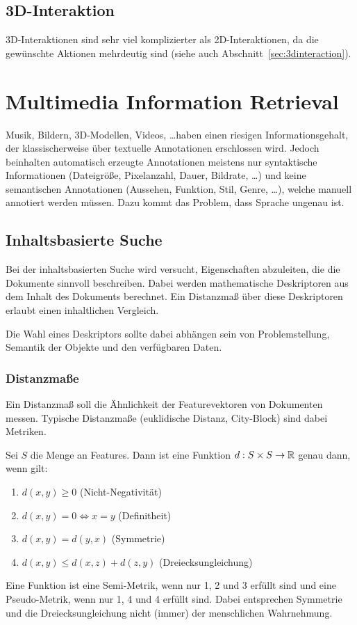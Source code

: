 	\section{3D-Interaktion}
		3D-Interaktionen sind sehr viel komplizierter als 2D-Interaktionen, da die gewünschte Aktionen mehrdeutig sind (siehe auch Abschnitt~\ref{sec:3dinteraction}).

\chapter{Multimedia Information Retrieval}
	Musik, Bildern, 3D-Modellen, Videos, \dots haben einen riesigen Informationsgehalt, der klassischerweise über textuelle Annotationen erschlossen wird. Jedoch beinhalten automatisch erzeugte Annotationen meistens nur syntaktische Informationen (Dateigröße, Pixelanzahl, Dauer, Bildrate, \dots) und keine semantischen Annotationen (Aussehen, Funktion, Stil, Genre, \dots), welche manuell annotiert werden müssen. Dazu kommt das Problem, dass Sprache \iA ungenau ist.

	\section{Inhaltsbasierte Suche}
		Bei der inhaltsbasierten Suche wird versucht, Eigenschaften abzuleiten, die die Dokumente sinnvoll beschreiben. Dabei werden mathematische Deskriptoren aus dem Inhalt des Dokuments berechnet. Ein Distanzmaß über diese Deskriptoren erlaubt einen inhaltlichen Vergleich.
		
		Die Wahl eines Deskriptors sollte dabei abhängen sein von Problemstellung, Semantik der Objekte und den verfügbaren Daten.

		\subsection{Distanzmaße}
			Ein Distanzmaß soll die Ähnlichkeit der Featurevektoren von Dokumenten messen. Typische Distanzmaße (euklidische Distanz, City-Block) sind dabei Metriken.
			
			Sei \(S\) die Menge an Features. Dann ist eine Funktion \( d : S \times S \to \mathbb{R} \) genau dann, wenn gilt:
			\begin{enumerate}
				\item \( d(x, y) \geq 0 \) (Nicht-Negativität)
				\item \( d(x, y) = 0 \iff x = y \) (Definitheit)
				\item \( d(x, y) = d(y, x) \) (Symmetrie)
				\item \( d(x, y) \leq d(x, z) + d(z, y) \) (Dreiecksungleichung)
			\end{enumerate}
			Eine Funktion ist eine Semi-Metrik, wenn nur 1, 2 und 3 erfüllt sind und eine Pseudo-Metrik, wenn nur 1, 4 und 4 erfüllt sind. Dabei entsprechen Symmetrie und die Dreiecksungleichung nicht (immer) der menschlichen Wahrnehmung.

